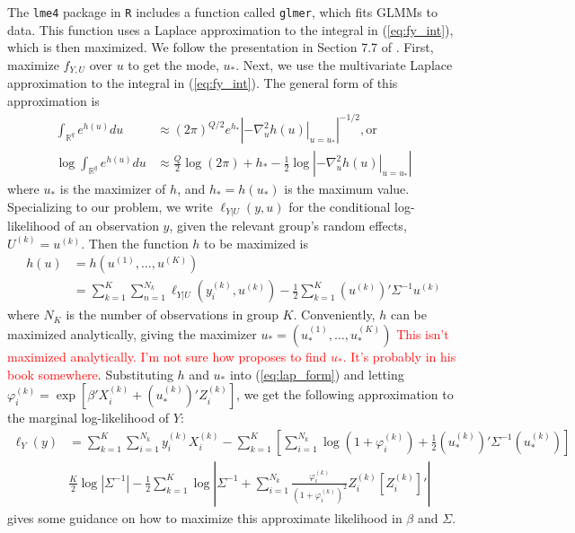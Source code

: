 \documentclass{article}
\newcommand{\bR}{\mathbb{R}}
\begin{document}
The \texttt{lme4} package in \texttt{R} includes a function called \texttt{glmer}, which fits GLMMs to data. This function uses a Laplace approximation to the integral in (\ref{eq:fy_int}), which is then maximized. We follow the presentation in Section 7.7 of \citet{Dem04}. First, maximize $f_{Y,U}$ over $u$ to get the mode, $u_*$. Next, we use the multivariate Laplace approximation to the integral in (\ref{eq:fy_int}). The general form of this approximation is
%
\begin{align}
    \int_{\bR^q} e^{h(u)} du &\approx (2 \pi)^{Q/2} e^{h_*} \left| \left.  - \nabla^2_u h(u) \right|_{u = u_*} \right|^{-1/2} \mathrm{, or}\\
    \log \int_{\bR^q} e^{h(u)} du & \approx \frac{Q}{2} \log(2\pi) + h_* - \frac{1}{2} \log \left| \left.  - \nabla^2_u h(u) \right|_{u = u_*} \right| \label{eq:lap_form}
\end{align}
%
where $u_*$ is the maximizer of $h$, and $h_* = h(u_*)$ is the maximum value. Specializing to our problem, we write $\ell_{Y|U}(y, u)$ for the conditional log-likelihood of an observation $y$, given the relevant group's random effects, $U^{(k)}=u^{(k)}$. Then the function $h$ to be maximized is 
%
\begin{align}
    h(u) &= h(u^{(1)}, \ldots, u^{(K)})\\
    &= \sum_{k=1}^K \sum_{n=1}^{N_k} \ell_{Y|U}(y_i^{(k)}, u^{(k)}) - \frac{1}{2} \sum_{k=1}^K (u^{(k)})' \Sigma^{-1} u^{(k)} \label{eq:lap_obj}
\end{align}
%
where $N_K$ is the number of observations in group $K$. Conveniently, $h$ can be maximized analytically, giving the maximizer $u_* = (u^{(1)}_*,\ldots, u^{(K)}_*)$ \textcolor{red}{This isn't maximized analytically. I'm not sure how \citeauthor{Dem04} proposes to find $u_*$. It's probably in his book somewhere}. Substituting $h$ and $u_*$ into (\ref{eq:lap_form}) and letting $\varphi_i^{(k)} = \exp[\beta' X_i^{(k)} + (u_*^{(k)})' Z_i^{(k)}]$, we get the following approximation to the marginal log-likelihood of $Y$:
%
\begin{align}
    \ell_Y(y) &= \sum_{k=1}^K \sum_{i=1}^{N_k} y_i^{(k)} X_i^{(k)} - \sum_{k=1}^K \left[ \sum_{i=1}^{N_k} \log(1 + \varphi_i^{(k)}) + \frac{1}{2} (u_*^{(k)})' \Sigma^{-1} (u_*^{(k)}) \right] \nonumber\\
    & \frac{K}{2}\log \left| \Sigma^{-1} \right| - \frac{1}{2} \sum_{k=1}^K \log \left| \Sigma^{-1} + \sum_{i=1}^{N_k} \frac{\varphi_i^{(k)}}{\left(1 + \varphi_i^{(k)}\right)^2} Z_i^{(k)} \left[ Z_i^{(k)} \right]' \right|
\end{align}
\citeauthor{Dem04} gives some guidance on how to maximize this approximate likelihood in $\beta$ and $\Sigma$.
\end{document}

